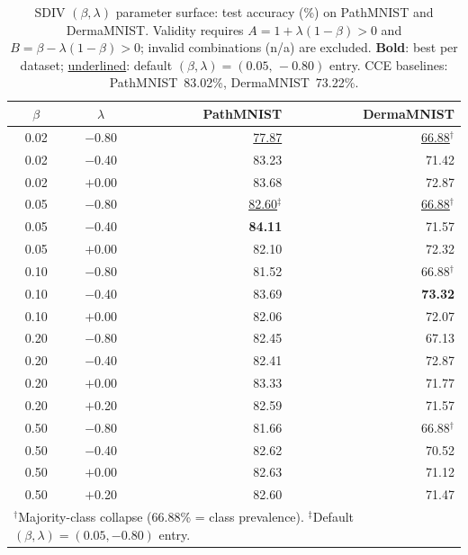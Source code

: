 
\begin{table}[t]
\centering
\caption{%
SDIV $(\beta,\lambda)$ parameter surface: test accuracy (\%) on PathMNIST
and DermaMNIST.
Validity requires $A{=}1{+}\lambda(1{-}\beta)>0$ and
$B{=}\beta{-}\lambda(1{-}\beta)>0$; invalid combinations (n/a) are excluded.
\textbf{Bold}: best per dataset; \underline{underlined}: default
$(\beta,\lambda){=}(0.05,\,-0.80)$ entry.
CCE baselines: PathMNIST~83.02\%, DermaMNIST~73.22\%.
}
\label{tab:sdiv_surface}
\small
\setlength{\tabcolsep}{5pt}
\begin{tabular}{@{}cc rr@{}}
\toprule
$\beta$ & $\lambda$ & \textbf{PathMNIST} & \textbf{DermaMNIST} \\
\midrule
0.02 & $-$0.80 & \underline{\phantom{0}77.87} & \underline{66.88}$^\dagger$ \\
0.02 & $-$0.40 & 83.23 & 71.42 \\
0.02 & $+$0.00 & 83.68 & 72.87 \\
\midrule
0.05 & $-$0.80 & \underline{82.60}$^\ddagger$ & \underline{66.88}$^\dagger$ \\
0.05 & $-$0.40 & \textbf{84.11} & 71.57 \\
0.05 & $+$0.00 & 82.10 & 72.32 \\
\midrule
0.10 & $-$0.80 & 81.52 & 66.88$^\dagger$ \\
0.10 & $-$0.40 & 83.69 & \textbf{73.32} \\
0.10 & $+$0.00 & 82.06 & 72.07 \\
\midrule
0.20 & $-$0.80 & 82.45 & 67.13 \\
0.20 & $-$0.40 & 82.41 & 72.87 \\
0.20 & $+$0.00 & 83.33 & 71.77 \\
0.20 & $+$0.20 & 82.59 & 71.57 \\
\midrule
0.50 & $-$0.80 & 81.66 & 66.88$^\dagger$ \\
0.50 & $-$0.40 & 82.62 & 70.52 \\
0.50 & $+$0.00 & 82.63 & 71.12 \\
0.50 & $+$0.20 & 82.60 & 71.47 \\
\midrule
\multicolumn{4}{l}{%
  \footnotesize $^\dagger$Majority-class collapse (66.88\% = class prevalence).
  $^\ddagger$Default $(\beta,\lambda)=(0.05,-0.80)$ entry.
} \\
\bottomrule
\end{tabular}
\end{table}
